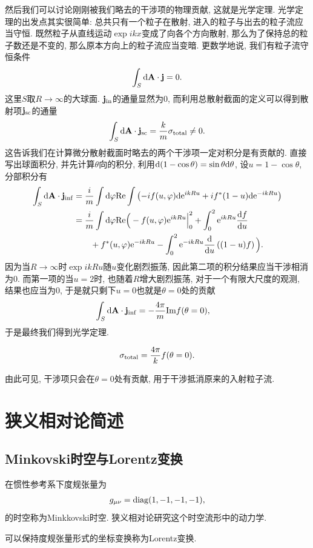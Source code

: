 然后我们可以讨论刚刚被我们略去的干涉项的物理贡献, 这就是光学定理. 光学定理的出发点其实很简单: 总共只有一个粒子在散射, 进入的粒子与出去的粒子流应当守恒. 既然粒子从直线运动$\exp{ikx}$变成了向各个方向散射, 那么为了保持总的粒子数还是不变的, 那么原本方向上的粒子流应当变暗. 更数学地说, 我们有粒子流守恒条件
\begin{align}
    \int_S\d\vec A\cdot\vec j=0.
\end{align}
这里$S$取$R\to\infty$的大球面. $\vec j_{\rm{in}}$的通量显然为$0$, 而利用总散射截面的定义可以得到散射项$\vec j_{\rm{sc}}$的通量
\begin{align}
    \int_S\d\vec A\cdot\vec j_{\rm{sc}}=\frac km\sigma_{\rm{total}}\neq0.
\end{align}
这告诉我们在计算微分散射截面时略去的两个干涉项一定对积分是有贡献的. 直接写出球面积分, 并先计算$\theta$向的积分, 利用$\d(1-\cos\theta)=\sin\theta\d\theta$, 设$u=1-\cos\theta$, 分部积分有
\begin{align}
    \int_S\d\vec A\cdot\vec j_{\rm{inf}}&=\frac im\int\d\varphi\rm{Re}\int \left(-if(u,\varphi)\d\exp{ikRu}+if^*(1-u)\d\exp{-ikRu}\right)\notag\\
    &=\frac{i}m\int\d\varphi\rm{Re}\Big(-f(u,\varphi)\exp{ikRu}\Big|_0^2+\int_0^2\exp{ikRu}\de fu\notag\\
    &\qquad+f^*(u,\varphi)\exp{-ikRu}-\int_0^2\exp{-ikRu}\de{}u\left((1-u)f\right)\Big).
\end{align}
因为当$R\to\infty$时$\exp{ikRu}$随$u$变化剧烈振荡, 因此第二项的积分结果应当干涉相消为$0$. 而第一项的当$u=2$时, 也随着$R$增大剧烈振荡, 对于一个有限大尺度的观测, 结果也应当为$0$, 于是就只剩下$u=0$也就是$\theta=0$处的贡献
\begin{align}
    \int_S\d\vec A\cdot\vec j_{\rm{inf}}&=-\frac{4\pi}m\rm{Im}f(\theta=0),
\end{align}
于是最终我们得到光学定理.
\begin{theorem}[光学定理]
    \begin{align}
        \sigma_{\rm{total}}=\frac{4\pi}k f(\theta=0).
    \end{align}
\end{theorem}
由此可见, 干涉项只会在$\theta=0$处有贡献, 用于干涉抵消原来的入射粒子流.

\newpage
\section{狭义相对论简述}
\subsection{Minkovski时空与Lorentz变换\label{sr-lorentz}}
在惯性参考系下度规张量为
\begin{align}
    g_{\mu\nu}=\rm{diag}(1, -1, -1, -1),
\end{align}
的时空称为Minkkovski时空. 狭义相对论研究这个时空流形中的动力学.
\begin{definition}[Lorentz变换]
    可以保持度规张量形式的坐标变换称为Lorentz变换.
\end{definition}

